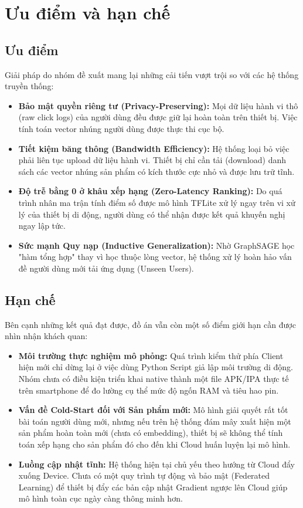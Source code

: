 \section{Ưu điểm và hạn chế}

\subsection{Ưu điểm}
Giải pháp do nhóm đề xuất mang lại những cải tiến vượt trội so với các hệ thống truyền thống:
\begin{itemize}
    \item \textbf{Bảo mật quyền riêng tư (Privacy-Preserving):} Mọi dữ liệu hành vi thô (raw click logs) của người dùng đều được giữ lại hoàn toàn trên thiết bị. Việc tính toán vector nhúng người dùng được thực thi cục bộ.
    
    \item \textbf{Tiết kiệm băng thông (Bandwidth Efficiency):} Hệ thống loại bỏ việc phải liên tục upload dữ liệu hành vi. Thiết bị chỉ cần tải (download) danh sách các vector nhúng sản phẩm có kích thước cực nhỏ và được lưu trữ tĩnh.
    
    \item \textbf{Độ trễ bằng 0 ở khâu xếp hạng (Zero-Latency Ranking):} Do quá trình nhân ma trận tính điểm số được mô hình TFLite xử lý ngay trên vi xử lý của thiết bị di động, người dùng có thể nhận được kết quả khuyến nghị ngay lập tức.
    
    \item \textbf{Sức mạnh Quy nạp (Inductive Generalization):} Nhờ GraphSAGE học "hàm tổng hợp" thay vì học thuộc lòng vector, hệ thống xử lý hoàn hảo vấn đề người dùng mới tải ứng dụng (Unseen Users).
\end{itemize}

\subsection{Hạn chế}
Bên cạnh những kết quả đạt được, đồ án vẫn còn một số điểm giới hạn cần được nhìn nhận khách quan:
\begin{itemize}
    \item \textbf{Môi trường thực nghiệm mô phỏng:} Quá trình kiểm thử phía Client hiện mới chỉ dừng lại ở việc dùng Python Script giả lập môi trường di động. Nhóm chưa có điều kiện triển khai native thành một file APK/IPA thực tế trên smartphone để đo lường cụ thể mức độ ngốn RAM và tiêu hao pin.
    
    \item \textbf{Vấn đề Cold-Start đối với Sản phẩm mới:} Mô hình giải quyết rất tốt bài toán người dùng mới, nhưng nếu trên hệ thống đám mây xuất hiện một sản phẩm hoàn toàn mới (chưa có embedding), thiết bị sẽ không thể tính toán xếp hạng cho sản phẩm đó cho đến khi Cloud huấn luyện lại mô hình.
    
    \item \textbf{Luồng cập nhật tĩnh:} Hệ thống hiện tại chủ yếu theo hướng từ Cloud đẩy xuống Device. Chưa có một quy trình tự động và bảo mật (Federated Learning) để thiết bị đẩy các bản cập nhật Gradient ngược lên Cloud giúp mô hình toàn cục ngày càng thông minh hơn.
\end{itemize}


